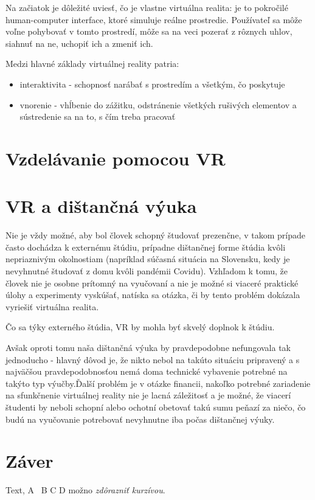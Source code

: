 \documentclass[10pt,twoside,slovak,a4paper]{article}
\begin{document}
Na začiatok je dôležité uviesť, čo je vlastne virtuálna realita: je to pokročilé human-computer interface, ktoré simuluje reálne prostredie.\cite{VR} Používateľ sa môže voľne pohybovať v tomto prostredí, môže sa na veci pozerať z rôznych uhlov, siahnuť na ne, uchopiť ich a zmeniť ich. 

Medzi hlavné základy virtuálnej reality patria:
\begin{itemize}
\item interaktivita - schopnosť narábať s prostredím a všetkým, čo poskytuje
\item vnorenie - vhĺbenie do zážitku, odstránenie všetkých rušivých elementov a sústredenie sa na to, s čím treba pracovať
\end{itemize}

\section{Vzdelávanie pomocou VR} \label{tretia}


\section{VR a dištančná výuka} \label{stvrta}

Nie je vždy možné, aby bol človek schopný študovať prezenčne, v takom prípade často dochádza k externému štúdiu, prípadne dištančnej forme štúdia kvôli nepriaznivým okolnostiam (napríklad súčasná situácia na Slovensku, kedy je nevyhnutné študovať z domu kvôli pandémii Covidu). Vzhľadom k tomu, že človek nie je osobne prítomný na vyučovaní a nie je možné si viaceré praktické úlohy a experimenty vyskúšať, natíska sa otázka, či by tento problém dokázala vyriešiť virtuálna realita.

Čo sa týky externého štúdia, VR by mohla byť skvelý doplnok k štúdiu.

Avšak oproti tomu naša dištančná výuka by pravdepodobne nefungovala tak jednoducho - hlavný dôvod je, že nikto nebol na takúto situáciu pripravený a s najväčšou pravdepodobnosťou nemá doma technické vybavenie potrebné na takýto typ výučby.Ďalší problém je v otázke financii, nakoľko potrebné zariadenie na sfunkčnenie virtuálnej reality nie je lacná záležitosť a je možné, že viacerí študenti by neboli schopní alebo ochotní obetovať takú sumu peňazí za niečo, čo budú na vyučovanie potrebovať nevyhnutne iba počas dištančnej výuky.


\section{Záver} \label{zaver} 
Text\cite{Study}, A~\cite{Surgery} B \cite{Learning}C \cite{Engineering} D  \cite{Games} možno \emph{zdôrazniť kurzívou}.







\end{document}
